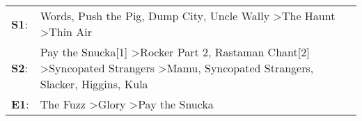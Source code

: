 \begin{supertabular}{p{0.03\textwidth}p{0.92\textwidth}}
 \textbf{S1}:  &                                                                                                                                                            Words\textsuperscript{}, \enspace Push the Pig\textsuperscript{}, \enspace Dump City\textsuperscript{}, \enspace Uncle Wally\textsuperscript{} \textgreater \enspace The Haunt\textsuperscript{} \textgreater \enspace Thin Air\textsuperscript{}  \enspace  \\
 \textbf{S2}:  &  Pay the Snucka[1]\textsuperscript{} \textgreater \enspace Rocker Part 2\textsuperscript{}, \enspace Rastaman Chant[2]\textsuperscript{} \textgreater \enspace Syncopated Strangers\textsuperscript{} \textgreater \enspace Mamu\textsuperscript{}, \enspace Syncopated Strangers\textsuperscript{}, \enspace Slacker\textsuperscript{}, \enspace Higgins\textsuperscript{}, \enspace Kula\textsuperscript{}  \enspace  \\
 \textbf{E1}:  &                                                                                                                                                                                                                                                                              The Fuzz\textsuperscript{} \textgreater \enspace Glory\textsuperscript{} \textgreater \enspace Pay the Snucka\textsuperscript{}  \enspace  \\
\end{supertabular}
